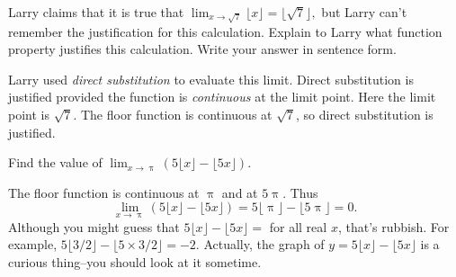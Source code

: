 \documentclass[12pt, answers,fleqn]{exam}
\begin{document}
\large


\vspace{0.1in}

\begin{questions} 

    \large


\question Larry claims that it is true that
$\displaystyle
    \lim_{x \to \sqrt{7}} \lfloor x \rfloor = \lfloor \sqrt{7} \rfloor,
$
but Larry can't remember the justification for this calculation. Explain to 
Larry what function property justifies this calculation. Write your answer in
sentence form.
\begin{solution} Larry used \emph{direct substitution} to evaluate this limit. Direct
    substitution is justified provided the function is \emph{continuous} at the limit 
    point.  Here the limit point is $\sqrt{7}$. The floor function is continuous 
    at $\sqrt{7}$, so direct substitution is justified.    
\end{solution}

\question Find the value of \(\displaystyle \lim_{x \to \uppi} 
\left(5 \lfloor x \rfloor -  \lfloor 5 x \rfloor  \right) \).
\begin{solution} The floor function is continuous at $\uppi$ and at $5 \uppi$. Thus
    \[
    \lim_{x \to \uppi} 
\left(5 \lfloor x \rfloor -  \lfloor 5 x \rfloor  \right) 
 = 5 \lfloor \uppi \rfloor -  \lfloor 5 \uppi \rfloor
 = 0.
    \]
Although you might guess that $5 \lfloor x \rfloor -  \lfloor 5 x \rfloor = $
for all real $x$, that's rubbish. For example, 
$5 \lfloor 3/2 \rfloor -  \lfloor 5 \times 3/2 \rfloor = -2$. Actually,
the graph of $y = 5 \lfloor x \rfloor -  \lfloor 5 x \rfloor$ is a curious
thing--you should look at it sometime.
\end{solution}


\end{questions}
\end{document}
